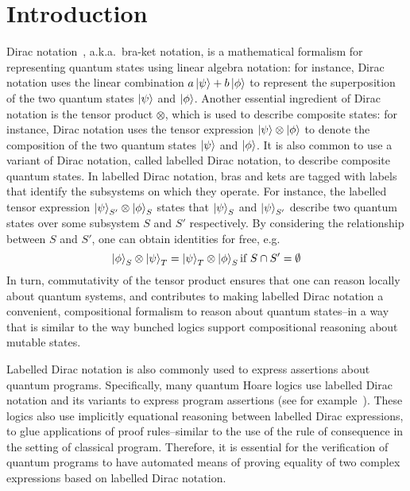 
\section{Introduction}


Dirac notation~\cite{dirac1939new}, a.k.a.\, bra-ket notation, is a
mathematical formalism for representing quantum states using linear
algebra notation: for instance, Dirac notation uses the linear
combination \( a\ket{\psi} + b\ket{\phi} \) to represent the
superposition of the two quantum states \( \ket{\psi} \) and
\( \ket{\phi} \). Another essential ingredient of Dirac notation
is the tensor product $\otimes$, which is used to describe composite
states: for instance, Dirac notation uses the tensor expression
\( \ket{\psi} \otimes \ket{\phi} \) to denote the composition of
the two quantum states \( \ket{\psi} \) and \( \ket{\phi} \). It is
also common to use a variant of Dirac notation, called labelled Dirac
notation, to describe composite quantum states. In labelled Dirac
notation, bras and kets are tagged with labels that identify the
subsystems on which they operate. For instance, the labelled tensor
expression
\( \ket{\psi}_{S'} \otimes \ket{\phi}_{S} \)
states that $\ket{\psi}_S$ and $\ket{\psi}_{S'}$ describe two quantum
states over some subsystem $S$ and $S'$ respectively. By considering
the relationship between $S$ and $S'$, one can obtain identities for
free, e.g.\, 
%
$$\ket{\phi}_S \otimes \ket{\psi}_{T} = \ket{\psi}_{T} \otimes \ket{\phi}_S
\mbox{if}~S\cap S'=\emptyset$$
%
In turn, commutativity of the tensor product ensures that one can
reason locally about quantum systems, and contributes to making
labelled Dirac notation a convenient, compositional formalism to
reason about quantum states--in a way that is similar to the way
bunched logics support compositional reasoning about mutable states.

Labelled Dirac notation is also commonly used to express assertions
about quantum programs. Specifically, many quantum Hoare logics use
labelled Dirac notation and its variants to express program assertions (see for example~\cite{DBLP:conf/lics/ZhouBHYY21,Zhou2023,qRHL_unruh2019,QSL_Le_2022,Zhong2024-np,incorrectness_2022,qafny2024}). These logics also use
implicitly equational reasoning between labelled Dirac expressions, to
glue applications of proof rules--similar to the use of the rule of
consequence in the setting of classical program. Therefore, it is
essential for the verification of quantum programs to have automated
means of proving equality of two complex expressions based on labelled
Dirac notation.


